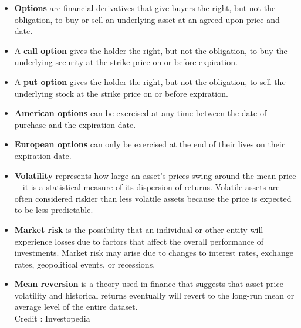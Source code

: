 \begin{itemize}
	\item \textbf{Options} are financial derivatives that give buyers the
		right, but not the obligation, to buy or sell an underlying asset
		at an agreed-upon price and date.
	\item A \textbf{call option} gives the holder the right, but not the
		obligation, to buy the underlying security at the strike price on or
		before expiration.
	\item A \textbf{put option} gives the holder the right, but not the
		obligation, to sell the underlying stock at the strike price on or
		before expiration.
    \item \textbf{American options} can be exercised at any time between the
		date of purchase and the expiration date.
    \item \textbf{European options} can only be exercised at the end of
		their lives on their expiration date.
    \item \textbf{Volatility} represents how large an asset's prices swing
		around the mean price—it is a statistical measure of its
		dispersion of returns.
		Volatile assets are often considered riskier than less volatile
		assets because the price is expected to be less predictable.
    \item \textbf{Market risk} is the possibility that an individual or other
		entity will experience losses due to factors that affect the
		overall performance of investments.
		Market risk may arise due to changes to interest rates,
		exchange rates, geopolitical events, or recessions.
    \item \textbf{Mean reversion} is a theory used in finance that suggests
		that asset price volatility and historical returns eventually will
		revert to the long-run mean or average level of the entire dataset. \\
		Credit : Investopedia
\end{itemize}